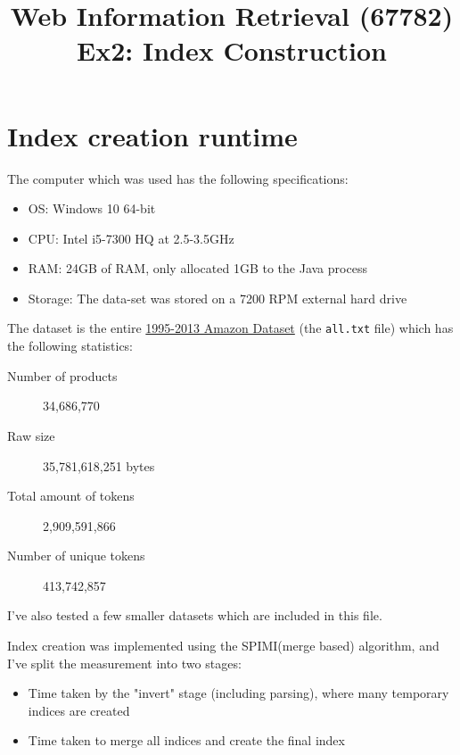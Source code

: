 \documentclass[11pt]{article}
\begin{document}
\title{Web Information Retrieval (67782)\\ Ex2: Index Construction}
\date{}

\maketitle
{}

\section{Index creation runtime}

The computer which was used has the following specifications:

\begin{itemize}
	\item OS: Windows 10 64-bit
	\item CPU: Intel i5-7300 HQ at 2.5-3.5GHz
	\item RAM: 24GB of RAM, only allocated 1GB to the Java process
	\item Storage: The data-set was stored on a 7200 RPM external hard drive
\end{itemize}

The dataset is the entire \href{https://snap.stanford.edu/data/web-Amazon.html}{1995-2013 Amazon Dataset} (the \texttt{all.txt} file) 
which has the following statistics:

\begin{description}
	\item[Number of products] 34,686,770
	\item[Raw size] 35,781,618,251 bytes
	\item[Total amount of tokens] 2,909,591,866
	\item[Number of unique tokens] 413,742,857
\end{description}

I've also tested a few smaller datasets which are included in this file.

Index creation was implemented using the SPIMI(merge based) algorithm, and I've split the measurement into two stages:

\begin{itemize}
	\item Time taken by the "invert" stage (including parsing), where many temporary indices are created
	\item Time taken to merge all indices and create the final index
\end{itemize}
\end{document}
